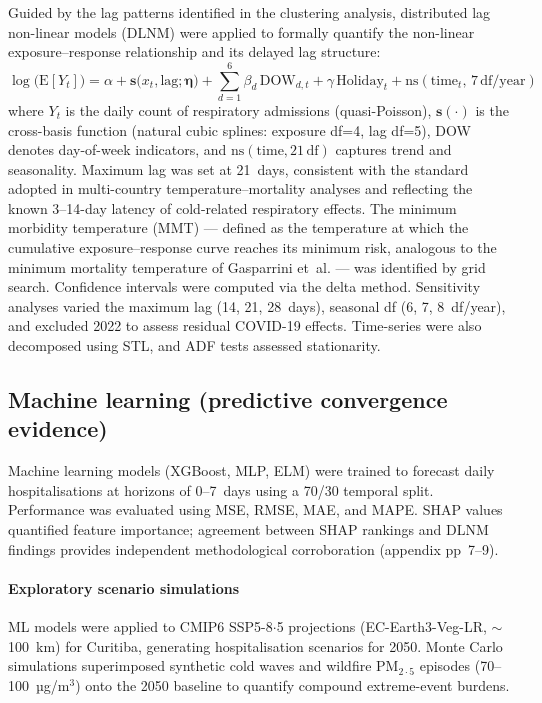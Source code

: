 \documentclass[review,number]{elsarticle}
\begin{document}
Guided by the lag patterns identified in the clustering analysis,
distributed lag non-linear models
(DLNM)\cite{Gasparrini2010,Gasparrini2011} were applied to formally
quantify the non-linear exposure--response relationship and its
delayed lag structure:
%
\begin{equation}
  \log\!\big(\mathrm{E}[Y_t]\big) = \alpha
    + \mathbf{s}\bigl(x_t, \mathrm{lag}; \boldsymbol{\eta}\bigr)
    + \sum_{d=1}^{6} \beta_d \,\mathrm{DOW}_{d,t}
    + \gamma \,\mathrm{Holiday}_t
    + \mathrm{ns}(\mathrm{time}_t,\, 7\,\mathrm{df/year})
  \label{eq:dlnm}
\end{equation}
%
where $Y_t$ is the daily count of respiratory admissions (quasi-Poisson),
$\mathbf{s}(\cdot)$ is the cross-basis function (natural cubic splines:
exposure df=4, lag df=5), DOW denotes day-of-week indicators, and
$\mathrm{ns}(\mathrm{time}, 21\,\mathrm{df})$ captures trend and
seasonality. Maximum lag was set at 21~days, consistent with the
standard adopted in multi-country temperature--mortality
analyses\cite{Gasparrini2015} and reflecting the known 3--14-day
latency of cold-related respiratory
effects.\cite{Linares2025,Cheng2024} The minimum morbidity temperature
(MMT) --- defined as the temperature at which the cumulative
exposure--response curve reaches its minimum risk, analogous to the
minimum mortality temperature of Gasparrini
et~al.\cite{Gasparrini2015} --- was identified by grid search.
Confidence intervals were computed via the delta method. Sensitivity
analyses varied the maximum lag (14, 21, 28~days), seasonal df
(6, 7, 8~df/year), and excluded 2022 to assess residual COVID-19
effects. Time-series were also
decomposed using STL, and ADF tests assessed stationarity.

\subsection{Machine learning (predictive convergence evidence)}

Machine learning models (XGBoost,\cite{Chen2016}
MLP,\cite{Goodfellow2016} ELM\cite{Huang2006}) were trained to
forecast daily hospitalisations at horizons of 0--7~days using a
70/30 temporal split. Performance was evaluated using MSE, RMSE, MAE,
and MAPE. SHAP values\cite{Lundberg2017} quantified feature
importance; agreement between SHAP rankings and DLNM findings
provides independent methodological corroboration (appendix pp~7--9).

\paragraph{Exploratory scenario simulations}
ML models were applied to CMIP6 SSP5-8${\cdot}$5 projections
(EC-Earth3-Veg-LR, $\sim$100~km) for Curitiba, generating
hospitalisation scenarios for 2050. Monte Carlo simulations
superimposed synthetic cold waves and wildfire $\text{PM}_{2{\cdot}5}$
episodes (70--100~µg/m$^3$) onto the 2050 baseline to quantify
compound extreme-event burdens.
\end{document}
